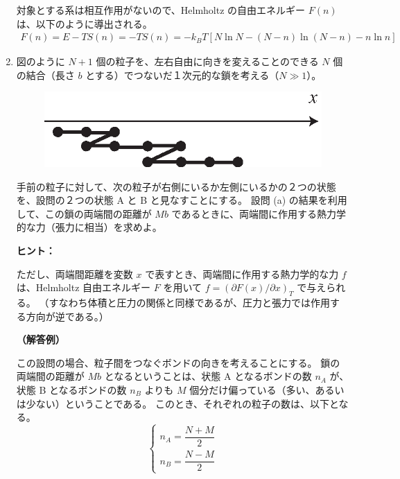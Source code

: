 \documentclass[uplatex,dvipdfmx,a4paper,11pt]{jsarticle}
\begin{document}
\begin{enumerate}
対象とする系は相互作用がないので、Helmholtz の自由エネルギー $F(n)$ は、以下のように導出される。
\begin{align*}
F(n) = E - TS(n) = -TS(n) = -k_B T [ N\ln N  - (N-n) \ln (N-n)  - n\ln n ] 
\end{align*}

\newpage

\item
図のように $N+1$ 個の粒子を、左右自由に向きを変えることのできる $N$ 個の結合（長さ $b$ とする）でつないだ１次元的な鎖を考える（$N \gg 1$）。

\begin{figure}[h]
	\begin{center}
	\includegraphics{./figures/FIG_chain.eps}
	\end{center}
\end{figure}
手前の粒子に対して、次の粒子が右側にいるか左側にいるかの２つの状態を、設問の２つの状態 A と B と見なすことにする。
設問 (a) の結果を利用して、この鎖の両端間の距離が $Mb$ であるときに、両端間に作用する熱力学的な力（張力に相当）を求めよ。
\vspace{8pt}

\begin{itembox}[l]{{\bf ヒント：}}

ただし、両端間距離を変数 $x$ で表すとき、両端間に作用する熱力学的な力 $f$ は、Helmholtz 自由エネルギー $F$ を用いて $f = (\partial F(x)/\partial x)_T$ で与えられる。
（すなわち体積と圧力の関係と同様であるが、圧力と張力では作用する方向が逆である。）

\end{itembox}

{\bf （解答例）}

この設問の場合、粒子間をつなぐボンドの向きを考えることにする。
鎖の両端間の距離が $Mb$ となるということは、状態 A となるボンドの数 $n_A$ が、状態 B となるボンドの数 $n_B$ よりも $M$ 個分だけ偏っている（多い、あるいは少ない）ということである。
このとき、それぞれの粒子の数は、以下となる。
\begin{equation*}
\begin{cases}
n_A = \dfrac{N+M}{2} \\[10pt]
n_B = \dfrac{N-M}{2}
\end{cases}
\end{equation*}


\end{enumerate}
\end{document}
